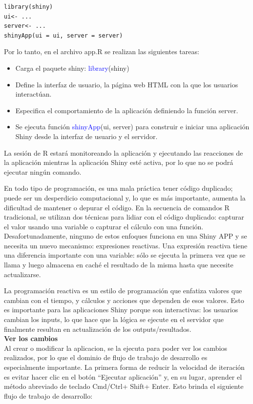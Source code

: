 \begin{lstlisting}
library(shiny)
ui<- ...
server<- ...
shinyApp(ui = ui, server = server)
\end{lstlisting}


Por lo tanto, en el archivo app.R se realizan las siguientes tareas:

\begin{itemize}
\item Carga el paquete shiny: \textcolor{blue}{library}(shiny)
\item Define la interfaz de usuario, la página web HTML con la que los usuarios interactúan.
\item Especifica el comportamiento de la aplicación definiendo la función server. 
\item Se ejecuta función \textcolor{blue}{shinyApp}(ui, server) para construir e iniciar una aplicación Shiny desde la interfaz de usuario y el servidor.
\end{itemize}


La sesión de R estará monitoreando la aplicación y ejecutando las reacciones de la aplicación mientras la aplicación Shiny esté activa, por lo que no se podrá ejecutar ningún comando.

En todo tipo de programación, es una mala práctica tener código duplicado; puede ser un desperdicio computacional y, lo que es más importante, aumenta la dificultad de mantener o depurar el código. En la secuencia de comandos R tradicional, se utilizan dos técnicas para lidiar con el código duplicado: capturar el valor usando una variable o capturar el cálculo con una función. Desafortunadamente, ninguno de estos enfoques funciona en una Shiny APP y se necesita un nuevo mecanismo: expresiones reactivas. Una expresión reactiva tiene una diferencia importante con una variable: sólo se ejecuta la primera vez que se llama y luego almacena en caché el resultado de la misma hasta que necesite actualizarse.

La programación reactiva es un estilo de programación que enfatiza valores que cambian con el tiempo, y cálculos y acciones que dependen de esos valores. Esto es importante para las aplicaciones Shiny porque son interactivas: los usuarios cambian los inputs, lo que hace que la lógica se ejecute en el servidor que finalmente resultan en actualización de los outputs/resultados.\\

\textbf{Ver los cambios}\\

Al crear o modificar la aplicacion, se la ejecuta para poder ver los cambios realizados, por lo que el dominio de flujo de trabajo de desarrollo es especialmente importante. La primera forma de reducir la velocidad de iteración es evitar hacer clic en el botón ``Ejecutar aplicación'' y, en su lugar, aprender el método abreviado de teclado Cmd/Ctrl+ Shift+ Enter. Esto brinda el siguiente flujo de trabajo de desarrollo:

